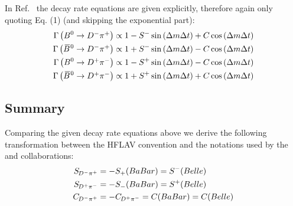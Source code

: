 \subsection{\belle}

In Ref.~\cite{Ronga:2006hv} the decay rate equations are given explicitly, therefore again only quoting Eq. (1) (and skipping
the exponential part):
\begin{align}
\Gamma\left(B^0\rightarrow \mbox{\ensuremath{D^{-}\pi^{+}}}\right) \propto 1-S^{-}\sin\left(\Delta m \Delta t\right)+C\cos\left(\Delta m \Delta t\right) \\
\Gamma\,\big({\kern 0.18em\overline{\kern -0.18em B}{}{}^{\kern 0.06em 0}}\rightarrow \mbox{\ensuremath{D^{-}\pi^{+}}}\big) \propto 1+S^{-}\sin\left(\Delta m \Delta t\right)-C\cos\left(\Delta m \Delta t\right) \\
\Gamma\left(B^0\rightarrow \mbox{\ensuremath{D^{+}\pi^{-}}}\right) \propto 1-S^{+}\sin\left(\Delta m \Delta t\right)-C\cos\left(\Delta m \Delta t\right) \\
\Gamma\,\big({\kern 0.18em\overline{\kern -0.18em B}{}{}^{\kern 0.06em 0}}\rightarrow \mbox{\ensuremath{D^{+}\pi^{-}}}\big) \propto 1+S^{+}\sin\left(\Delta m \Delta t\right)+C\cos\left(\Delta m \Delta t\right)
\end{align}

\subsection{Summary}

Comparing the given decay rate equations above we derive the following transformation between the HFLAV convention and the
notations used by the \babar and \belle collaborations:
\begin{align}
\mbox{\ensuremath{S_{\kern -0.8pt D^{-}\pi^{+}}}} &= -S_{+}(BaBar) = S^{-}(Belle)\\
\mbox{\ensuremath{S_{\kern -0.8pt D^{+}\pi^{-}}}} &= -S_{-}(BaBar) = S^{+}(Belle)\\
\mbox{\ensuremath{C_{\kern -0.8pt D^{-}\pi^{+}}}} &= -\mbox{\ensuremath{C_{\kern -0.8pt D^{+}\pi^{-}}}} = C(BaBar) = C(Belle)
\end{align}
